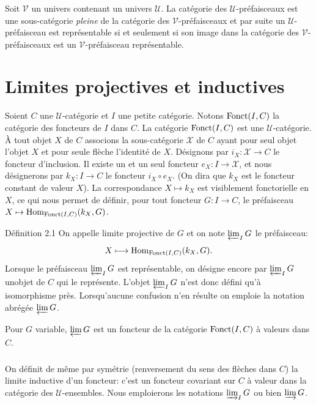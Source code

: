 \documentclass[10pt]{../fichiers-configuration-latex/smfart}
\begin{document}
\subsubsection{}
Soit $𝒱$ un univers contenant un univers $𝒰$. La
catégorie des $𝒰$-préfaisceaux est une sous-catégorie
\emph{pleine} de la catégorie des $𝒱$-préfaisceaux et par
suite un $𝒰$-préfaisceau est représentable si et seulement
si son image dans la catégorie des $𝒱$-préfaisceaux est un
$𝒱$-préfaisceau représentable.

\section{Limites projectives et inductives}

Soient $C$ une $𝒰$-catégorie et $I$ une petite catégorie.
Notons $\operatorname{Fonct}(I,C)$ la catégorie des foncteurs de $I$ dans $C$. La
catégorie $\operatorname{Fonct}(I,C)$ est une $𝒰$-catégorie. À tout objet
$X$ de $C$ associons la sous-catégorie $𝒳$ de $C$ ayant pour
seul objet l'objet $X$ et pour seule flèche l'identité de $X$.
Désignons par $i_X:𝒳\rightarrow C$ le foncteur d'inclusion.
Il existe un et un seul foncteur $e_X:I\rightarrow 𝒳$, et
nous désignerons par $k_X:I\rightarrow C$ le foncteur $i_X\circ
e_X$. (On dira que $k_X$ est le foncteur constant de valeur $X$). La
correspondance $X\mapsto k_X$ est visiblement fonctorielle en $X$,
ce qui nous permet de définir, pour tout foncteur $G:I\rightarrow
C$, le préfaisceau $X\mapsto \operatorname{Hom}_{\operatorname{Fonct}(I,C)}(k_X,G)$.

\begin{enonce*}{Définition 2.1}
On appelle limite projective de $G$ et on note $\varprojlim_I G$ le
préfaisceau:
$$
X\longmapsto \operatorname{Hom}_{\operatorname{Fonct}(I,C)}(k_X,G){}.
$$
Lorsque le préfaisceau $\varprojlim_I G$ est représentable, on
désigne encore par $\varprojlim_I G$ un\pageoriginale objet de $C$
qui le représente. L'objet $\varprojlim_I G$ n'est donc défini qu'à
isomorphisme près. Lorsqu'aucune confusion n'en résulte on emploie
la notation abrégée $\varprojlim G$.
\end{enonce*}

Pour $G$ variable, $\varprojlim G$ est un foncteur de la catégorie
$\operatorname{Fonct}(I,C)$ à valeurs dans $\widehat{C}$.

\setcounter{subsection}{1} \setcounter{subsubsection}{0}
\subsubsection{}
On définit de même par symétrie (renversement du sens des flèches
dans $C$) la limite inductive d'un foncteur: c'est un foncteur
covariant sur $C$ à valeur dans la catégorie des
$𝒰$-ensembles. Nous emploierons les notations $\varinjlim_I
G$ ou bien $\varinjlim G$.
\end{document}
